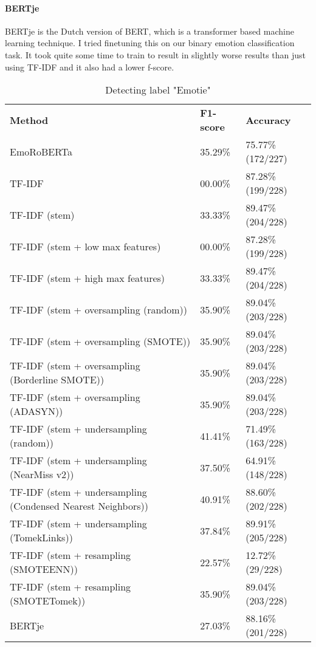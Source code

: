 \documentclass{article}
\begin{document}
\paragraph{BERTje} BERTje is the Dutch version of BERT, which is a transformer based machine learning technique. \cite{de2019bertje} I tried finetuning this on our binary emotion classification task. It took quite some time to train to result in slightly worse results than just using TF-IDF and it also had a lower f-score.

\begin{table}[]
\begin{tabular}{lll}
\textbf{Method}                                             & \textbf{F1-score} & \textbf{Accuracy} \\
EmoRoBERTa                                                  & 35.29\%           & 75.77\% (172/227) \\
TF-IDF                                                      & 00.00\%           & 87.28\% (199/228) \\
TF-IDF (stem)                                               & 33.33\%           & 89.47\% (204/228) \\
TF-IDF (stem + low max features)                            & 00.00\%           & 87.28\% (199/228) \\
TF-IDF (stem + high max features)                           & 33.33\%           & 89.47\% (204/228) \\
TF-IDF (stem + oversampling (random))                       & 35.90\%           & 89.04\% (203/228) \\
TF-IDF (stem + oversampling (SMOTE))                        & 35.90\%           & 89.04\% (203/228) \\
TF-IDF (stem + oversampling (Borderline SMOTE))             & 35.90\%           & 89.04\% (203/228) \\
TF-IDF (stem + oversampling (ADASYN))                       & 35.90\%           & 89.04\% (203/228) \\
TF-IDF (stem + undersampling (random))                      & 41.41\%           & 71.49\% (163/228) \\
TF-IDF (stem + undersampling (NearMiss v2))                 & 37.50\%           & 64.91\% (148/228) \\
TF-IDF (stem + undersampling (Condensed Nearest Neighbors)) & 40.91\%           & 88.60\% (202/228) \\
TF-IDF (stem + undersampling (TomekLinks))                  & 37.84\%           & 89.91\% (205/228) \\
TF-IDF (stem + resampling (SMOTEENN))                       & 22.57\%           & 12.72\% (29/228)  \\
TF-IDF (stem + resampling (SMOTETomek))                     & 35.90\%           & 89.04\% (203/228) \\
BERTje                                                      & 27.03\%           & 88.16\% (201/228)
\end{tabular}
\caption{Detecting label "Emotie"}
\label{tab:emotions}
\end{table}
\end{document}
